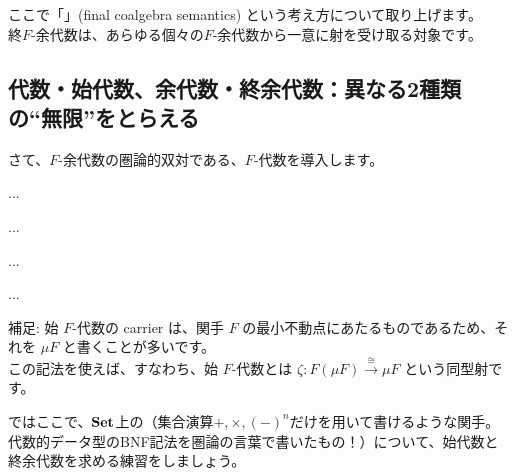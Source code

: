 \documentclass[
		head_space=20mm,
		foot_space=20mm,
		gutter=10mm,
		line_length=190mm
]{jlreq}
\begin{document}
\clearpage


\noindent ここで「」(final coalgebra semantics) という考え方について取り上げます。\\
\noindent 終$F$-余代数は、あらゆる個々の$F$-余代数から一意に射を受け取る対象です。


\clearpage

\subsection{代数・始代数、余代数・終余代数：異なる2種類の``無限''をとらえる}

さて、$F$-余代数の圏論的双対である、$F$-代数を導入します。

\begin{definition}[代数]
	... 
\end{definition}

\begin{definition}[始代数]
	... 
\end{definition}

\begin{proposition}[ランベックの補題]
	... 
\end{proposition}

\begin{theorem}[始代数の構成]
	... 
\end{theorem}


\noindent 補足: 始 $F$-代数の carrier は、関手 $F$ の最小不動点にあたるものであるため、それを $\mu F$ と書くことが多いです。\\この記法を使えば、すなわち、始 $F$-代数とは $\zeta:F(\mu F)\xrightarrow{\cong} \mu F$ という同型射です。

\clearpage

\noindent ではここで、$\mathbf{Set}$上の（集合演算$+,\times,{(-)}^{n}$だけを用いて書けるような関手。代数的データ型のBNF記法を圏論の言葉で書いたもの！）について、始代数と終余代数を求める練習をしましょう。
\vspace{6pt}
\end{document}
